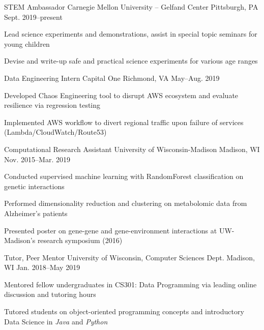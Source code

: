 \documentclass[10pt, letterpaper]{awesome-cv}
\begin{document}
\begin{cventries}
    \cventry
        {STEM Ambassador}
        {Carnegie Mellon University -- Gelfand Center}
        {Pittsburgh, PA}
        {Sept. 2019--present}
        {\begin{cvitems} 
            \item Lead science experiments and demonstrations, assist in special topic seminars for young children
            \item Devise and write-up safe and practical science experiments for various age ranges 
        \end{cvitems}}    
    \cventry
        {Data Engineering Intern}
        {Capital One}
        {Richmond, VA}
        {May--Aug. 2019}
        {\begin{cvitems} 
            \item Developed Chaos Engineering tool to disrupt AWS ecosystem and evaluate resilience via regression testing 
            \item Implemented AWS workflow to divert regional traffic upon failure of services (Lambda/CloudWatch/Route53)\\
        \end{cvitems}}
        
    \cventry
        {Computational Research Assistant}
        {University of Wisconsin-Madison}
        {Madison, WI}
        {Nov. 2015--Mar. 2019}
        {\begin{cvitems} 
            \item Conducted supervised machine learning with RandomForest classification on genetic interactions
            \item Performed dimensionality reduction and clustering on metabolomic data from Alzheimer's patients
            \item Presented poster on gene-gene and gene-environment interactions at UW-Madison's research symposium (2016) 
        \end{cvitems}}
    
    \cventry
        {Tutor, Peer Mentor}
        {University of Wisconsin, Computer Sciences Dept.}
        {Madison, WI}
        {Jan. 2018--May 2019}
        {\begin{cvitems} 
          \item Mentored fellow undergraduates in CS301: Data Programming via leading online discussion and tutoring hours
          \item Tutored students on object-oriented programming concepts and introductory Data Science in \textit{Java} and \textit{Python}
        \end{cvitems}}  
        

\end{cventries}
\end{document}
